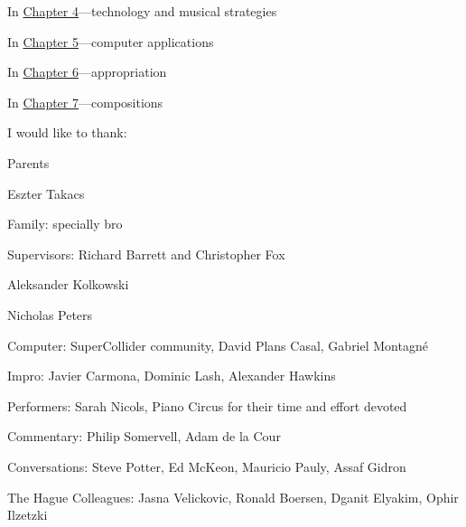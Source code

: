 In \hyperlink{chapter4}{Chapter 4}---technology and musical strategies 

In \hyperlink{chapter5}{Chapter 5}---computer applications

In \hyperlink{chapter6}{Chapter 6}---appropriation

In \hyperlink{chapter7}{Chapter 7}---compositions

I would like to thank:

Parents 

Eszter Takacs

Family: specially bro

Supervisors: Richard Barrett and Christopher Fox

Aleksander Kolkowski

Nicholas Peters

Computer: SuperCollider community, David Plans Casal, Gabriel Montagn\'e

Impro: Javier Carmona, Dominic Lash, Alexander Hawkins

Performers: Sarah Nicols, Piano Circus for their time and effort devoted

Commentary: Philip Somervell, Adam de la Cour

Conversations: Steve Potter, Ed McKeon, Mauricio Pauly, Assaf Gidron

The Hague Colleagues: Jasna Velickovic, Ronald Boersen, Dganit Elyakim, Ophir Ilzetzki

\label{ch:preface}
